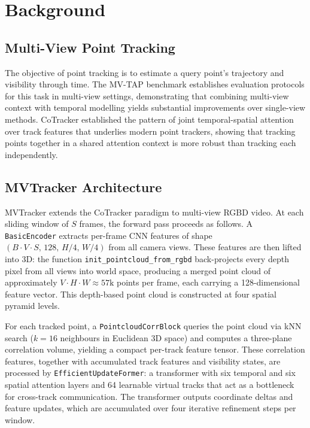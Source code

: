 \documentclass[12pt, a4paper, oneside]{report}
\begin{document}
\chapter{Background}
\label{ch:background}
\section{Multi-View Point Tracking}
The objective of point tracking is to estimate a query point's trajectory and visibility through time. The MV-TAP benchmark \cite{koo2025mvtaptrackingpointmultiview} establishes evaluation protocols for this task in multi-view settings, demonstrating that combining multi-view context with temporal modelling yields substantial improvements over single-view methods. CoTracker \cite{karaev2023cotracker} established the pattern of joint temporal-spatial attention over track features that underlies modern point trackers, showing that tracking points together in a shared attention context is more robust than tracking each independently.

\section{MVTracker Architecture}
\label{sec:mvtracker_arch}
MVTracker \cite{rajic2025multiview3dpointtracking} extends the CoTracker paradigm to multi-view RGBD video. At each sliding window of $S$ frames, the forward pass proceeds as follows. A \texttt{BasicEncoder} extracts per-frame CNN features of shape $(B \cdot V \cdot S,\, 128,\, H/4,\, W/4)$ from all camera views. These features are then lifted into 3D: the function \texttt{init\_pointcloud\_from\_rgbd} back-projects every depth pixel from all views into world space, producing a merged point cloud of approximately $V \cdot H \cdot W \approx 57\text{k}$ points per frame, each carrying a 128-dimensional feature vector. This depth-based point cloud is constructed at four spatial pyramid levels.

For each tracked point, a \texttt{PointcloudCorrBlock} queries the point cloud via kNN search ($k=16$ neighbours in Euclidean 3D space) and computes a three-plane correlation volume, yielding a compact per-track feature tensor. These correlation features, together with accumulated track features and visibility states, are processed by \texttt{EfficientUpdateFormer}: a transformer with six temporal and six spatial attention layers and 64 learnable virtual tracks that act as a bottleneck for cross-track communication. The transformer outputs coordinate deltas and feature updates, which are accumulated over four iterative refinement steps per window.
\end{document}
